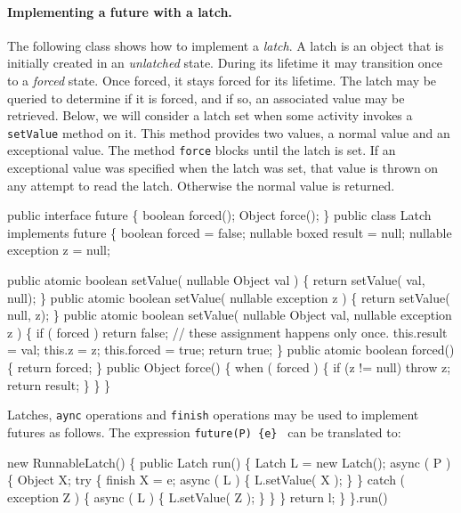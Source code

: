 {{\paragraph{ Implementing a future with a latch.}\label{future-imp}
The following class shows how to implement a {\em latch}. A latch is
an object that is initially created in an {\em unlatched}
state. During its lifetime it may transition once to a {\em forced}
state. Once forced, it stays forced for its
lifetime. The latch may be queried to determine if it is forced, and
if so, an associated value may be retrieved. Below, we will consider a
latch set when some activity invokes a {\tt setValue} method on
it. This method provides two values, a normal value and an exceptional
value. The method {\tt force} blocks until the latch is set. If an
exceptional value was specified when the latch was set, that value is
thrown on any attempt to read the latch. Otherwise the normal value is
returned.

\begin{x10}
public interface future \{
   boolean forced();
   Object force();
\}
public class Latch implements future \{
  boolean forced = false;
  nullable boxed result = null;
  nullable exception z = null;

  public atomic 
   boolean setValue( nullable Object val ) \{
   return setValue( val, null);
    \}
   public atomic 
   boolean setValue( nullable exception z ) \{
        return setValue( null, z);
    \}
    public atomic 
    boolean setValue( nullable Object val, 
                      nullable exception z ) \{
        if ( forced ) return false;
        // these assignment happens only once.
        this.result = val;
        this.z = z;
        this.forced = true;
        return true;
    \}
    public atomic boolean forced() \{
        return forced;
    \}
    public Object force() \{
        when ( forced ) \{
            if (z != null) throw z;
            return result;
        \}
    \}
\}
\end{x10}

Latches, {\tt aync} operations and {\tt finish} operations may be used
to implement futures as follows. The expression {\tt future(P) \{e\} }
can be translated to:
\begin{x10}
  new RunnableLatch() \{
      public Latch run() \{
         Latch L = new Latch();
         async ( P ) \{
            Object X;
            try \{
                finish X = e;
                async ( L ) \{
                   L.setValue( X ); 
                \}
            \} catch ( exception Z ) \{
               async ( L ) \{
                 L.setValue( Z );
               \}
            \}
         \}
         return l;
      \}
    \}.run()
\end{x10}

}}
